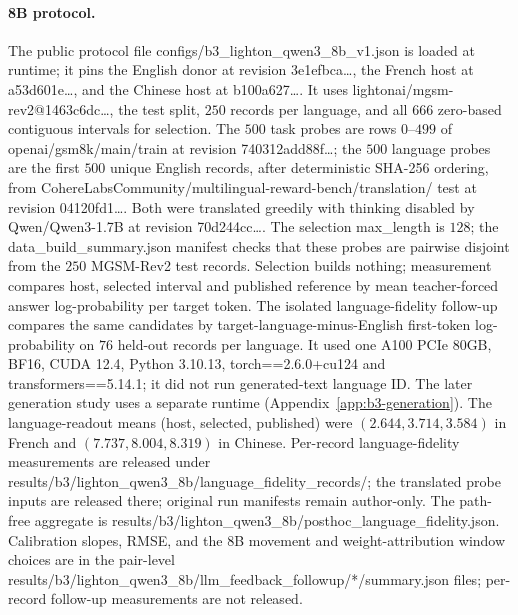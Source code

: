 \documentclass{article}
\newcommand{\artifact}[1]{\textsf{#1}}
\theoremstyle{plain}
\theoremstyle{definition}
\theoremstyle{remark}
\begin{document}
\paragraph{8B protocol.}
The public protocol file
\artifact{configs/b3\_lighton\_qwen3\_8b\_v1.json}
is loaded at runtime; it pins the English donor at revision
\artifact{3e1efbca}\ldots, the French host at
\artifact{a53d601e}\ldots, and the Chinese host at
\artifact{b100a627}\ldots. It uses
\artifact{lightonai/mgsm-rev2}@\artifact{1463c6dc}\ldots,
the test split, $250$ records per language, and all $666$ zero-based
contiguous intervals for selection.
The $500$ task probes are rows $0$--$499$ of
\artifact{openai/gsm8k}/\artifact{main}/\artifact{train}
at revision \artifact{740312add88f}\ldots; the $500$ language probes are the
first $500$ unique English records, after deterministic SHA-256 ordering, from
\artifact{CohereLabsCommunity/multilingual-reward-bench}/\artifact{translation}/
\artifact{test} at revision \artifact{04120fd1}\ldots. Both were translated
greedily with thinking disabled by \artifact{Qwen/Qwen3-1.7B} at revision
\artifact{70d244cc}\ldots. The selection \artifact{max\_length} is $128$;
the \artifact{data\_build\_summary.json} manifest checks that these probes are
pairwise disjoint from the $250$ MGSM-Rev2 test records.
Selection builds nothing; measurement compares host, selected interval and
published reference by mean teacher-forced answer log-probability per target
token. The isolated language-fidelity follow-up compares the same candidates
by target-language-minus-English first-token log-probability on $76$ held-out
records per language. It used one A100 PCIe 80GB, BF16, CUDA 12.4, Python
3.10.13, \artifact{torch==2.6.0+cu124} and
\artifact{transformers==5.14.1}; it did not run generated-text language ID.
The later generation study uses a separate runtime (Appendix~\ref{app:b3-generation}).
The language-readout means (host, selected, published) were
$(2.644,3.714,3.584)$ in French and $(7.737,8.004,8.319)$ in Chinese.
Per-record language-fidelity measurements are released under
\artifact{results/b3/lighton\_qwen3\_8b/language\_fidelity\_records/}; the
translated probe inputs are released there; original run manifests remain author-only. The
path-free aggregate is
\artifact{results/b3/lighton\_qwen3\_8b/posthoc\_language\_fidelity.json}.
Calibration slopes, RMSE, and the 8B movement and weight-attribution window
choices are in the pair-level
\artifact{results/b3/lighton\_qwen3\_8b/llm\_feedback\_followup/*/summary.json}
files; per-record follow-up measurements are not released.
\end{document}
